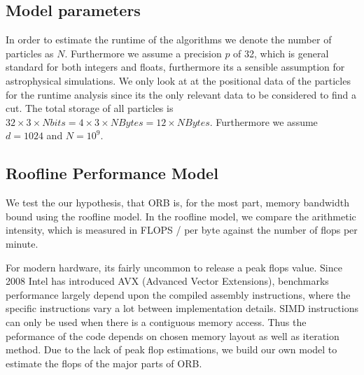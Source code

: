 \documentclass[]{article}
\begin{document}
\subsection{Model parameters}

\begin{comment}
If we investigate the operations which are needed for the binary cut algorithm, we notice that the actual operations completed inside the loop, are only very few. When comparing the CPU implementation with GPU one, we need to not only consider benefits from increased parallelism in GPU hardware, which will lead to a higher tflops, but also possible speed-ups reached by higher bandwidths in GPU memory than CPU memory. On the other hand we need to mitigate the very low bandwidths between the GPU and CPU, which cannot be avoided altogether, as the data needs to be sent from the CPU to GPU before we can process it on the graphics processor.
\end{comment}

In order to estimate the runtime of the algorithms we denote the number of particles as $N$. Furthermore we assume a precision $p$ of 32, which is general standard for both integers and floats, furthermore its a sensible assumption for astrophysical simulations. We only look at at the positional data of the particles for the runtime analysis since its the only relevant data to be considered to find a cut. The total storage of all particles is $32 \times 3 \times N bits = 4 \times 3 \times N Bytes = 12 \times N Bytes$. Furthermore we assume $d = 1024$ and $N=10^9$.


\subsection{Roofline Performance Model} \label{sec:roof}

We test the our hypothesis, that ORB is, for the most part, memory bandwidth bound using the roofline model. In the roofline model, we compare the arithmetic intensity, which is measured in FLOPS / per byte against the number of flops per minute. 

For modern hardware, its fairly uncommon to release a peak flops value. Since 2008 Intel has introduced AVX (Advanced Vector Extensions), benchmarks performance largely depend upon the compiled assembly instructions, where the specific instructions vary a lot between implementation details. SIMD instructions can only be used when there is a contiguous memory access. Thus the peformance of the code depends on chosen memory layout as well as iteration method. Due to the lack of peak flop estimations, we build our own model to estimate the flops of the major parts of ORB. 
\end{document}
